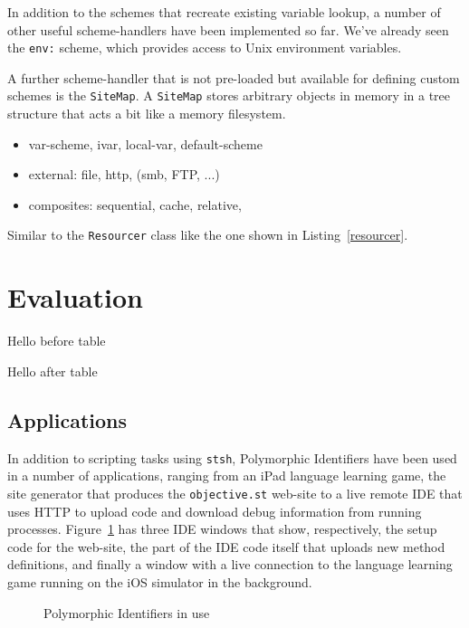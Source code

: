 \documentclass[preprint]{sigplanconf}
\begin{document}
In addition to the schemes that recreate existing variable lookup, a number
of other useful scheme-handlers have been implemented so far.  We've
already seen the {\tt env:} scheme, which provides access to Unix
environment variables.  

A further scheme-handler that is not pre-loaded but available for defining
custom schemes is the {\tt SiteMap}.  A {\tt SiteMap} stores arbitrary objects
in memory in a tree structure that acts a bit like a memory filesystem.



\begin{itemize}
\item var-scheme, ivar, local-var, default-scheme
\item external: file, http, (smb, FTP, ...)
\item composites:  sequential, cache, relative, 

\end{itemize}


Similar to the {\tt Resourcer} class like the one shown in Listing~\ref{resourcer}.


\section{Evaluation}
\label{evaluation}

Hello before table


Hello after table


\subsection{Applications}

In addition to scripting tasks using {\tt stsh}, Polymorphic Identifiers have been used in a number
of applications, ranging from an iPad language learning game, the site generator that produces the {\tt objective.st} web-site to a
live remote IDE that uses HTTP to upload code and download debug information from running processes.  Figure~\ref{pi-inuse}
has three IDE windows that show, respectively, the setup code for the web-site, the part of the IDE code itself that uploads new method definitions,
and finally a window with a live connection to the language learning game running on the iOS simulator in the background.

\begin{figure}[htbp]
\centering
\caption{Polymorphic Identifiers in use}
\label{pi-inuse}
\end{figure}
\end{document}

